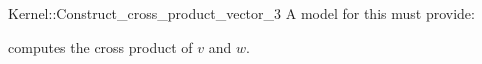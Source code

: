 \begin{ccRefFunctionObjectConcept}{Kernel::Construct_cross_product_vector_3}
A model for this must provide:



            {computes the cross product of $v$ and $w$.}

\ccIsModel{}

\end{ccRefFunctionObjectConcept}
